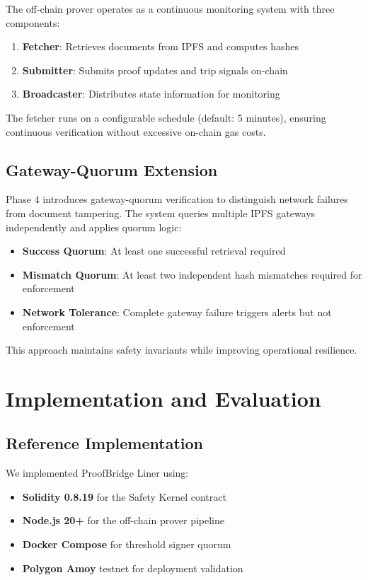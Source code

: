 \documentclass[10pt,conference]{IEEEtran}
\begin{document}
The off-chain prover operates as a continuous monitoring system with three components:

\begin{enumerate}
\item \textbf{Fetcher}: Retrieves documents from IPFS and computes hashes
\item \textbf{Submitter}: Submits proof updates and trip signals on-chain
\item \textbf{Broadcaster}: Distributes state information for monitoring
\end{enumerate}

The fetcher runs on a configurable schedule (default: 5 minutes), ensuring continuous verification without excessive on-chain gas costs.

\subsection{Gateway-Quorum Extension}
\label{subsec:gateway_quorum}

Phase 4 introduces gateway-quorum verification to distinguish network failures from document tampering. The system queries multiple IPFS gateways independently and applies quorum logic:

\begin{itemize}
\item \textbf{Success Quorum}: At least one successful retrieval required
\item \textbf{Mismatch Quorum}: At least two independent hash mismatches required for enforcement
\item \textbf{Network Tolerance}: Complete gateway failure triggers alerts but not enforcement
\end{itemize}

This approach maintains safety invariants while improving operational resilience.

\section{Implementation and Evaluation}
\label{sec:implementation}

\subsection{Reference Implementation}
\label{subsec:reference_implementation}

We implemented ProofBridge Liner using:
\begin{itemize}
\item \textbf{Solidity 0.8.19} for the Safety Kernel contract
\item \textbf{Node.js 20+} for the off-chain prover pipeline
\item \textbf{Docker Compose} for threshold signer quorum
\item \textbf{Polygon Amoy} testnet for deployment validation
\end{itemize}
\end{document}
